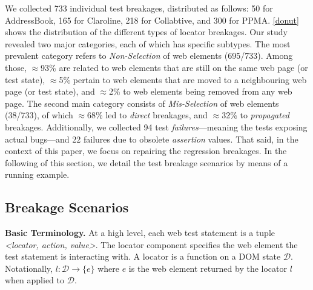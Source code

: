 \label{sec:study}
We collected 733 individual test breakages, distributed as follows: 50 for AddressBook, 165 for Claroline, 218 for Collabtive, and 300 for PPMA.
\autoref{donut} shows the distribution of the different types of locator breakages. Our study revealed two major categories, each of which has specific subtypes. The most prevalent category refers to \textit{Non-Selection} of web elements (695/733). Among those, $\approx$93\% are related to web elements that are still on the same web page (or test state), $\approx$5\% pertain to web elements that are moved to a neighbouring web page (or test state), and $\approx$2\% to web elements being removed from any web page.
The second main category consists of \textit{Mis-Selection} of web elements (38/733), of which $\approx$68\% led to \textit{direct} breakages, and $\approx$32\% to \textit{propagated} breakages. 
Additionally, we collected 94 test \textit{failures}---meaning the tests exposing actual bugs---and 22 failures due to obsolete \textit{assertion} values.
%
That said, in the context of this paper, we focus on repairing the regression breakages. In the following of this section, we detail the test breakage scenarios by means of a running example. 

\subsection{Breakage Scenarios}\label{sec:breakage-scenarios}

\noindent
\textbf{Basic Terminology.}
At a high level, each web test statement is a tuple \textit{<locator, action, value>}. 
The locator component specifies the web element the test statement is interacting with. A locator is a function on a DOM state $\mathcal{D}$. Notationally, $l: \mathcal{D} \rightarrow \{e\}$ where $e$ is the web element returned by the locator $l$ when applied to $\mathcal{D}$. 
%



